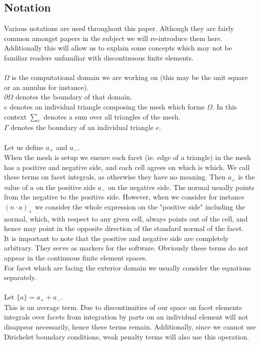 \documentclass[11pt,twoside,a4paper]{article}
\begin{document}
\subsection{Notation}
Various notations are used throughout this paper. Although they are fairly common amongst papers in the subject we will re-introduce them here. Additionally this will allow us to explain some concepts which may not be familiar readers unfamiliar with discontinuous finite elements.\\
\\
$\Omega$ is the computational domain we are working on (this may be the unit square or an annulus for instance).\\
$\partial \Omega$ denotes the boundary of that domain.\\
$e$ denotes an individual triangle composing the mesh which forms $\Omega$. In this context $\sum_e$ denotes a sum over all triangles of the mesh.\\
$\Gamma$ denotes the boundary of an individual triangle $e$.\\
\\
Let us define $a_+$ and $a_-$.\\
When the mesh is setup we ensure each facet (ie. edge of a triangle) in the mesh has a positive and negative side, and each cell agrees on which is which. We call these terms on facet integrals, as otherwise they have no meaning. Then $a_+$ is the value of $a$ on the positive side $a_-$ on the negative side. The normal usually points from the negative to the positive side. However, when we consider for instance $(n \cdot a)_+$ we consider the whole expression on the "positive side" including the normal, which, with respect to any given cell, always points out of the cell, and hence may point in the opposite direction of the standard normal of the facet.\\
It is important to note that the positive and negative side are completely arbitrary. They serve as markers for the software. Obviously these terms do not appear in the continuous finite element spaces.\\
For facet which are facing the exterior domain we usually consider the equations separately.\\
\\
Let $\{ a \} = a_+ + a_-$. \\
This is an average term. Due to discontinuities of our space on facet elements integrals over facets from integration by parts on an individual element will not disappear necessarily, hence these terms remain. Additionally, since we cannot use Dirichelet boundary conditions, weak penalty terms will also use this operation.\\
\end{document}
